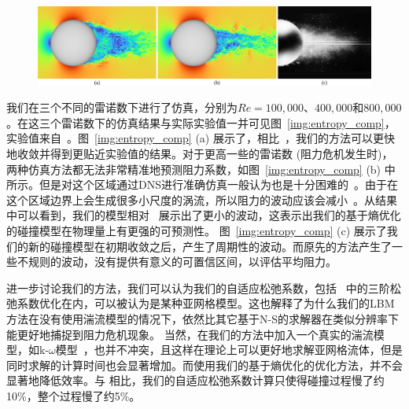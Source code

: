 \begin{figure}[!tb]
  \centering
    \includegraphics[width=0.99\columnwidth]{figures/wake_comp.png}
  \label{img:sphere_wake_comp}
\end{figure}

我们在三个不同的雷诺数下进行了仿真，分别为$Re=100,000$、$400,000$和$800,000$。在这三个雷诺数下的仿真结果与实际实验值一并可见图~\ref{img:entropy_comp}，实验值来自~\citep{Barati-2014}。图~\ref{img:entropy_comp} (a) 展示了，相比~\citep{Geier-2017}，我们的方法可以更快地收敛并得到更贴近实验值的结果。对于更高一些的雷诺数 (阻力危机发生时)，两种仿真方法都无法非常精准地预测阻力系数，如图~\ref{img:entropy_comp} (b) 中所示。但是对这个区域通过DNS进行准确仿真一般认为也是十分困难的~\citep{Tiwari-2020}。由于在这个区域边界上会生成很多小尺度的涡流，所以阻力的波动应该会减小~\citep{Deshpande-2017}。从结果中可以看到，我们的模型相对~\citep{Geier-2017} 展示出了更小的波动，这表示出我们的基于熵优化的碰撞模型在物理量上有更强的可预测性。
图~\ref{img:entropy_comp} (c) 展示了我们的新的碰撞模型在初期收敛之后，产生了周期性的波动。而原先的方法产生了一些不规则的波动，没有提供有意义的可置信区间，以评估平均阻力。

进一步讨论我们的方法，我们可以认为我们的自适应松弛系数，包括~\citep{Geier-2017} 中的三阶松弛系数优化在内，可以被认为是某种亚网格模型。这也解释了为什么我们的LBM方法在没有使用湍流模型的情况下，依然比其它基于N-S的求解器在类似分辨率下能更好地捕捉到阻力危机现象。
当然，在我们的方法中加入一个真实的湍流模型，如k-$\omega$模型~\citep{Menter-1994}，也并不冲突，且这样在理论上可以更好地求解亚网格流体，但是同时求解的计算时间也会显著增加。而使用我们的基于熵优化的优化方法，并不会显著地降低效率。与 \citep{Geier-2017} 相比，我们的自适应松弛系数计算只使得碰撞过程慢了约10\%，整个过程慢了约5\%。

